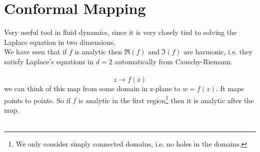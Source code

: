 \documentclass[a4paper,12pt]{article}
\begin{document}
\section{Conformal Mapping}
Very useful tool in fluid dynamics, since it is very closely tied to solving the Laplace equation in two dimensions.\\
We have seen that if $f$ is analytic then $\Re(f)$ and $\Im (f)$ are harmonic, i.e. they satisfy Laplace's equations in $d=2$ automatically from Causchy-Riemann.
\\\\
\begin{equation}
z\to f(z)
\end{equation}
we can think of this map from some domain in z-plane to $w=f(z)$. It maps points to points. So if $f$ is analytic in the first region\footnote{We only consider simply connected domains, i.e. no holes in the domains.} then it is analytic after the map.
\\\\
\end{document}
